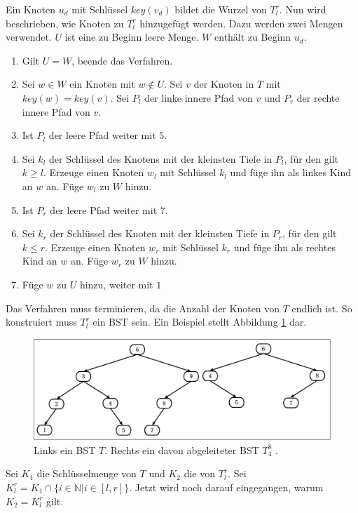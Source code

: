 \documentclass[a4paper,12pt]{article}
\begin{document}
\noindent Ein Knoten $u_d$ mit Schlüssel $\mathit{key}(v_d)$ bildet die Wurzel von $T^r_l$. Nun wird beschrieben, wie Knoten zu $T^r_l$ hinzugefügt werden.
Dazu werden zwei Mengen verwendet. $U$ ist eine zu Beginn leere Menge. $W$ enthält zu Beginn $u_d$.
\begin{enumerate}
	\item Gilt $U = W$, beende das Verfahren.
	\item Sei $w \in W$ ein Knoten mit $w \notin U$.  Sei $v$ der Knoten in $T$ mit \mbox{$\mathit{key}(w ) = \mathit{key}(v)$}. Sei $P_l$ der linke innere Pfad von $v$ und $P_r$ der rechte innere Pfad von $v$.
	\item Ist $P_l$ der leere Pfad weiter mit $5$.
	\item Sei $k_l$ der Schlüssel des Knotens mit der kleinsten Tiefe in $P_l$, für den gilt $k \geq l$. Erzeuge einen Knoten $w_l$ mit Schlüssel $k_l$ und füge ihn als linkes Kind an $w$ an. Füge $w_l$ zu $W$ hinzu.
	\item Ist $P_r$ der leere Pfad weiter mit $7$.
	\item Sei $k_r$ der Schlüssel des Knoten mit der kleinsten Tiefe in $P_r$, für den gilt  $k \leq r$. Erzeuge einen Knoten $w_r$ mit Schlüssel $k_r$ und füge ihn als rechtes Kind an $w$ an. Füge $w_r$ zu $W$ hinzu.	
	\item Füge $w$ zu $U$ hinzu, weiter mit $1$
\end{enumerate}
Das Verfahren muss terminieren, da die Anzahl der Knoten von $T$ endlich ist. So konstruiert muss $T^r_l$ ein BST sein. Ein Beispiel stellt Abbildung \ref{fig:T_r_l} dar. 
\begin{figure}[H]
	\centering
	\includegraphics[width= 1\textwidth]{"Medien/DynOpt/T_r_l"}
	\caption{Links ein BST $T$. Rechts ein davon abgeleiteter BST $T^8_4$ .  }
	\label{fig:T_r_l}
\end{figure}

\noindent Sei $K_1$ die Schlüsselmenge von $T$ und $K_2$ die von $T^r_l$. Sei ${K^r_l = K_1 \cap \{i \in \mathbb{N}\vert i \in \left[l,r\right] \}}$. Jetzt wird noch darauf eingegangen, warum $K_2 = K^r_l$ gilt. \\
\end{document}
